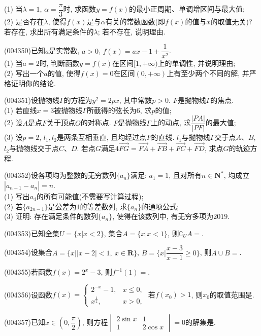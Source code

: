 (1) 当$\lambda=1$, $\alpha=\dfrac{\pi}3$时, 求函数$y=f(x)$的最小正周期、单调增区间与最大值;\\
(2) 是否存在$\lambda$, 使得$f(x)$是与$\alpha$有关的常数函数(即$f(x)$的值与$x$的取值无关)? 若存在, 求出所有满足条件的$\lambda$; 若不存在, 说明理由.
\item (004350)已知$a$是实常数, $a>0$, $f(x)=ax-1+\dfrac 1{x^2}$.\\
(1) 当$a=2$时, 判断函数$y=f(x)$在区间$[1,+\infty)$上的单调性, 并说明理由;\\
(2) 写出一个$a$的值, 使得$f(x)=0$在区间$(0,+\infty)$上有至少两个不同的解, 并严格证明你的结论.
\item (004351)设抛物线$\Gamma$的方程为$y^2=2px$, 其中常数$p>0$. $F$是抛物线$\Gamma$的焦点.\\
(1) 若直线$x=3$被抛物线$\Gamma$所截得的弦长为$6$, 求$p$的值;\\
(2) 设$A$是点$F$关于顶点$O$的对称点. $P$是抛物线$\Gamma$上的动点, 求$\dfrac{|PA|}{|PF|}$的最大值;\\
(3) 设$p=2$, $l_1,l_2$是两条互相垂直, 且均经过点$F$的直线. $l_1$与抛物线$\Gamma$交于点$A$、$B$, $l_2$与抛物线交于点$C$、$D$. 若点$G$满足$4\overrightarrow{FG}=\overrightarrow{FA}+\overrightarrow{FB}+\overrightarrow{FC}+\overrightarrow{FD}$, 求点$G$的轨迹方程.
\item (004352)设各项均为整数的无穷数列$\{a_n\}$满足: $a_1=1$, 且对所有$n\in \mathbf{N}^*$, 均成立$|a_{n+1}-a_n|=n$.\\
(1) 写出$a_4$的所有可能值(不需要写计算过程);\\
(2) 若$\{a_{2n-1}\}$是公差为$1$的等差数列, 求$\{{a_n}\}$的通项公式;\\
(3) 证明: 存在满足条件的数列$\{a_n\}$, 使得在该数列中, 有无穷多项为$2019$.
\item (004353)已知全集$U=\{x|x<2\}$, 集合$A=\{x|x<1\}$, 则$\complement_UA=$.
\item (004354)设集合$A=\{x||x-2|<1, \ x\in\mathbf{R}\}$, $B=\{x|\dfrac{x-3}{x-1}\ge 0\}$, 则$A\cup B=$.
\item (004355)若函数$f(x)=2^x-3$, 则$f^{-1}(1)=$.
\item (004356)设函数$f(x)=\begin{cases} 2^{-x}-1,  & x\le 0,\\ x^\frac 12, & x>0,\end{cases}$ 若$f(x_0)>1$, 则$x_0$的取值范围是.
\item (004357)已知$x\in (0,\dfrac{\pi}2)$, 则方程$\begin{vmatrix} 2\sin x   & 1  \\1  & 2\cos x  \end{vmatrix}=0$的解集是.

